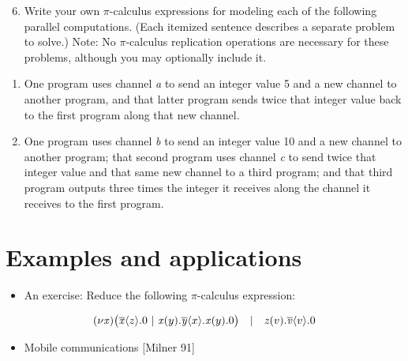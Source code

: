 \documentclass[letterpaper,10pt,openany,oneside]{sphinxmanual}
\begin{document}
\begin{enumerate}
\setcounter{enumi}{5}
\item {} 
Write your own $\pi$-calculus expressions for modeling each of the following parallel computations. (Each itemized sentence describes a separate problem to solve.) Note: No $\pi$-calculus replication operations are necessary for these problems, although you may optionally include it.

\end{enumerate}
\begin{enumerate}
\item {} 
One program uses channel \emph{a} to send an integer value 5 and a new channel to another program, and that latter program sends twice that integer value back to the first program along that new channel.

\item {} 
One program uses channel \emph{b} to send an integer value 10 and a new channel to another program; that second program uses channel \emph{c} to send twice that integer value and that same new channel to a third program; and that third program outputs three times the integer it receives along the channel it receives to the first program.

\end{enumerate}


\chapter{Examples and applications}
\label{ExamplesAndApplications/ExamplesAndApplications::doc}\label{ExamplesAndApplications/ExamplesAndApplications:examples-and-applications}\begin{itemize}
\item {} 
An exercise: Reduce the following $\pi$-calculus expression:

\end{itemize}
\begin{gather}
\begin{split}(\nu{\it x})\big(\overline{\it x}\langle z \rangle.{0}\ |\ {\it x}(y).\overline{\it y}\langle x \rangle.{\it x}(y).{0}\big) \quad|\quad {\it z}(v).\overline{\it v}\langle v \rangle.{0}\end{split}\notag
\end{gather}\begin{itemize}
\item {} 
Mobile communications {[}Milner 91{]}

\end{itemize}
\end{document}
